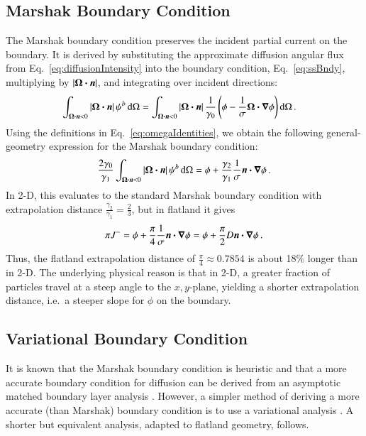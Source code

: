 \documentclass{anstrans}
\begin{document}
\subsection{Marshak Boundary Condition}
The Marshak boundary condition preserves the incident partial
current on the boundary. It is derived by substituting the approximate diffusion
angular flux from Eq.~\eqref{eq:diffusionIntensity} into the boundary condition,
Eq.~\eqref{eq:ssBndy}, multiplying by $\left| \bm{\Omega}\bm{\cdot} \bm{n} \right|$, and integrating over
incident directions:
\begin{align*}
\int_{\bm{\Omega}\bm{\cdot} \bm{n} < 0 } \left| \bm{\Omega}\bm{\cdot} \bm{n} \right|
\psi^b \mathop{}\!\mathrm{d}\Omega
 &= 
\int_{\bm{\Omega}\bm{\cdot} \bm{n} < 0 } \left| \bm{\Omega}\bm{\cdot} \bm{n} \right| 
 \frac{1}{\gamma_0} \left( \phi - \frac{1}{\sigma}
  \bm{\Omega} \bm{\cdot} \bm{\nabla} \phi \right)
  \mathop{}\!\mathrm{d}\Omega \,.
\end{align*}
Using the definitions in Eq.~\eqref{eq:omegaIdentities}, we
obtain the following general-geometry expression for the Marshak boundary
condition:
\begin{equation} \label{eq:marshak}
\frac{2\gamma_0}{\gamma_1}
\int_{\bm{\Omega}\bm{\cdot} \bm{n} < 0 } \left| \bm{\Omega}\bm{\cdot} \bm{n} \right|
\psi^b \mathop{}\!\mathrm{d}\Omega
=
\phi + \frac{\gamma_2}{\gamma_1}\frac{1}{\sigma} \bm{n} \bm{\cdot} \bm{\nabla} \phi \,.
\end{equation}
In 2-D, this evaluates to the standard Marshak boundary condition with
extrapolation distance $\frac{\gamma_2}{\gamma_1} = \frac23$, but in flatland
it gives
\begin{equation*}
\pi J^{-} = \phi + \frac{\pi}{4}\frac{1}{\sigma} \bm{n} \bm{\cdot} \bm{\nabla} \phi
= \phi + \frac{\pi}{2} D \bm{n} \bm{\cdot} \bm{\nabla} \phi\,.
\end{equation*}
Thus, the flatland extrapolation distance of $\frac{\pi}{4} \approx 0.7854$
is about 18\% longer than in 2-D.
The underlying physical reason is that in 2-D, a greater fraction of
particles travel at a steep angle to the $x,y$-plane, yielding a
shorter extrapolation distance, i.e.~a steeper slope for $\phi$ on the boundary.

\subsection{Variational Boundary Condition}
It is known that the Marshak boundary condition is heuristic and that
a more accurate boundary condition for diffusion can be derived from an
asymptotic matched boundary layer analysis \cite{Mal1991}. However, a simpler
method of deriving a more accurate (than Marshak) boundary condition is to use
a variational analysis \cite{Mal1991}.
A shorter but equivalent analysis, adapted to flatland geometry, follows.
\end{document}
